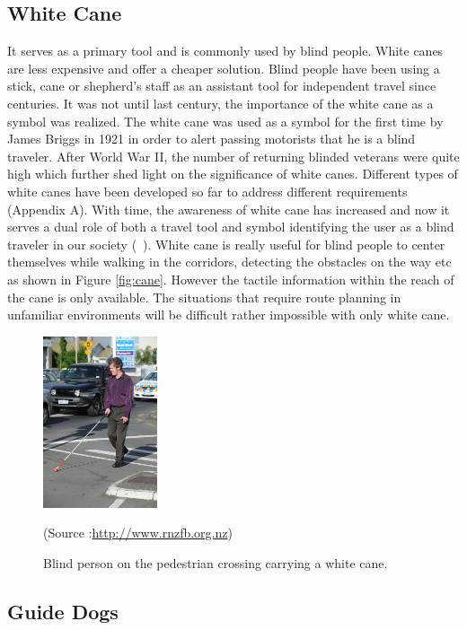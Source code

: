 \subsection{White Cane}
\label{sec:whitecane}

It serves as a primary tool and is 
commonly used by blind people. 
White canes are less expensive and offer a 
cheaper solution.
Blind people have been using a stick, 
cane or shepherd's staff as an 
assistant tool for independent travel since centuries. 
It was not until last century, the importance 
of the white cane as a symbol was 
realized. The white cane was used as a symbol for the first 
time by James Briggs in 1921 in order to alert passing 
motorists that he is a blind traveler. After World War II, 
the number of returning blinded veterans 
were quite high which further shed light on the 
significance of white canes. Different types of 
white canes have been developed so far
to address different requirements (Appendix A). 
With time, the awareness of white cane has 
increased and now it serves a dual role of both a travel 
tool and symbol identifying the user as a blind traveler
in our society (~\citet{cane1,cane2}). 
White cane is really useful for blind people 
to center themselves while walking in the corridors, 
detecting the obstacles on the way etc as 
shown in Figure \ref{fig:cane}. However the 
tactile information within the reach of the cane is only available. 
The situations that require route planning in unfamiliar environments 
will be difficult rather impossible with only white cane. 


\begin{figure}[h!]
\centering{} \includegraphics[width=0.3\textwidth]{Images/whitecane.png}
\caption{\label{fig:cane} Blind person on the pedestrian crossing carrying a white cane.}
\label{fig:dog}
\small (Source :\url{http://www.rnzfb.org.nz})
\end{figure}

\subsection{Guide Dogs}
\label{sec:guidedog}

